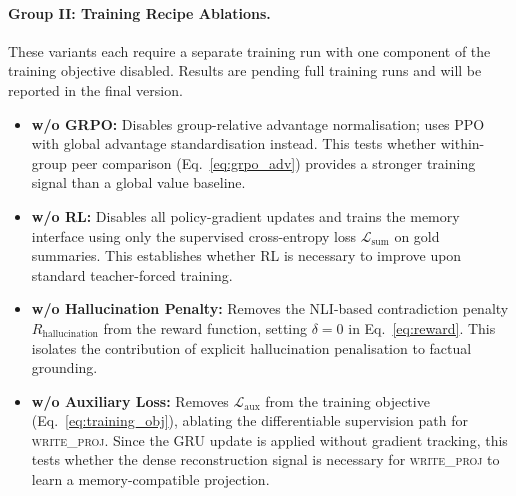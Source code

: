 \documentclass{article}
\begin{document}
\paragraph{Group II: Training Recipe Ablations.}
These variants each require a separate training run with one component of the training objective disabled.
Results are pending full training runs and will be reported in the final version.

\begin{itemize}
    \item \textbf{w/o GRPO:} Disables group-relative advantage normalisation; uses PPO with global advantage standardisation instead. This tests whether within-group peer comparison (Eq.~\ref{eq:grpo_adv}) provides a stronger training signal than a global value baseline.

    \item \textbf{w/o RL:} Disables all policy-gradient updates and trains the memory interface using only the supervised cross-entropy loss $\mathcal{L}_{\text{sum}}$ on gold summaries. This establishes whether RL is necessary to improve upon standard teacher-forced training.

    \item \textbf{w/o Hallucination Penalty:} Removes the NLI-based contradiction penalty $R_{\text{hallucination}}$ from the reward function, setting $\delta{=}0$ in Eq.~\ref{eq:reward}. This isolates the contribution of explicit hallucination penalisation to factual grounding.

    \item \textbf{w/o Auxiliary Loss:} Removes $\mathcal{L}_{\text{aux}}$ from the training objective (Eq.~\ref{eq:training_obj}), ablating the differentiable supervision path for \textsc{write\_proj}. Since the GRU update is applied without gradient tracking, this tests whether the dense reconstruction signal is necessary for \textsc{write\_proj} to learn a memory-compatible projection.
\end{itemize}
\end{document}
